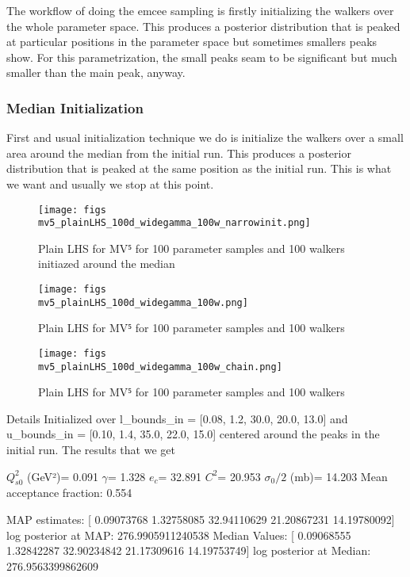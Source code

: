 \documentclass{article}
\begin{document}
The workflow of doing the emcee sampling is firstly initializing the walkers over the whole parameter space. This produces a posterior distribution that is peaked at particular positions in the parameter space but sometimes smallers peaks show. For this parametrization, the small peaks seam to be significant but much smaller than the main peak, anyway. 

\subsubsection{Median Initialization}
First and usual initialization technique we do is initialize the walkers over a small area around the median from the initial run. This produces a posterior distribution that is peaked at the same position as the initial run. This is what we want and usually we stop at this point.

\begin{figure}
\centering
\texttt{[image: figs\\mv5\_plainLHS\_100d\_widegamma\_100w\_narrowinit.png]}
\caption{Plain LHS for MV⁵ for 100 parameter samples and 100 walkers initiazed around the median}
\end{figure}


\begin{figure}
\centering
\texttt{[image: figs\\mv5\_plainLHS\_100d\_widegamma\_100w.png]}
\caption{Plain LHS for MV⁵ for 100 parameter samples and 100 walkers}
\label{fig:mv5_plainLHS_100d_widegamma_100w}
\end{figure}
    
\begin{figure}
\centering
\texttt{[image: figs\\mv5\_plainLHS\_100d\_widegamma\_100w\_chain.png]}
\caption{Plain LHS for MV⁵ for 100 parameter samples and 100 walkers}
\label{fig:mv5_plainLHS_100d_widegamma_100w_chain}
\end{figure}
    
Details
Initialized over l_bounds_in = [0.08, 1.2, 30.0, 20.0, 13.0] and u_bounds_in = [0.10, 1.4, 35.0, 22.0, 15.0] centered around the peaks in the initial run. The results that we get 

$Q_{s0}^{2}$ (GeV²)= 0.091
$\gamma$= 1.328
$e_c$= 32.891
$C^{2}$= 20.953
$\sigma_0/2$ (mb)= 14.203
Mean acceptance fraction: 0.554

MAP estimates:  [ 0.09073768  1.32758085 32.94110629 21.20867231 14.19780092]
log posterior at MAP:  276.9905911240538
Median Values:  [ 0.09068555  1.32842287 32.90234842 21.17309616 14.19753749]
log posterior at Median:  276.9563399862609
\end{document}
